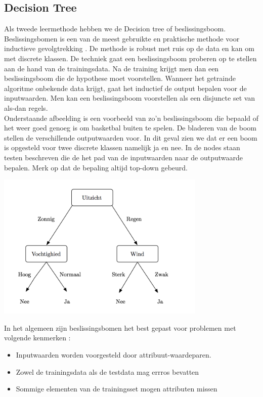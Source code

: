 \subsection{Decision Tree}\label{Decision Tree}
%
Als tweede leermethode hebben we de Decision tree of beslissingsboom. Beslissingsbomen is een van de meest gebruikte en praktische methode voor inductieve gevolgtrekking \cite{mitchell1997machine}. De methode is robust met ruis op de data en kan om met discrete klassen. De techniek gaat een beslissingsboom proberen op te stellen aan de hand van de trainingsdata. Na de training krijgt men dan een beslissingsboom die de hypothese moet voorstellen. Wanneer het getrainde algoritme onbekende data krijgt, gaat het inductief de output bepalen voor de inputwaarden. Men kan een beslissingsboom voorstellen als een disjuncte set van als-dan regels.\\ 
%
Onderstaande afbeelding is een voorbeeld van zo'n beslissingsboom die bepaald of het weer goed genoeg is om basketbal buiten te spelen. De bladeren van de boom stellen de verschillende outputwaarden voor. In dit geval zien we dat er een boom is opgesteld voor twee discrete klassen namelijk ja en nee. In de nodes staan testen beschreven die de het pad van de inputwaarden naar de outputwaarde bepalen. Merk op dat de bepaling altijd top-down gebeurd.
%
\begin{center}
  \includegraphics[width=10cm]{decisiontree}
  \label{fig:beslissingsboom}
\end{center}
%
In het algemeen zijn beslissingsbomen het best gepast voor problemen met volgende kenmerken \cite{mitchell1997machine}: 

\begin{itemize}
  \item{Inputwaarden worden voorgesteld door attribuut-waardeparen.}
  \item{Zowel de trainingsdata als de testdata mag errros bevatten}
  \item{Sommige elementen van de trainingsset mogen attributen missen}
\end{itemize}

